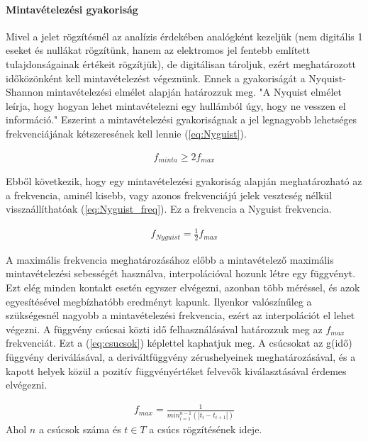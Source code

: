 \paragraph{Mintavételezési gyakoriság}
Mivel a jelet rögzítésnél az analízis érdekében analógként kezeljük (nem digitális 1 eseket és nullákat rögzítünk, hanem az elektromos jel fentebb említett tulajdonságainak értékeit rögzítjük), de digitálisan tároljuk, ezért meghatározott időközönként kell mintavételezést végeznünk. Ennek a gyakoriságát a Nyquist-Shannon mintavételezési elmélet alapján határozzuk meg. "A Nyquist elmélet leírja, hogy hogyan lehet mintavételezni egy hullámból úgy, hogy ne vesszen el információ."\cite{por2019nyquist} Eszerint a mintavételezési gyakoriságnak a jel legnagyobb lehetséges frekvenciájának kétszeresének kell lennie (\ref{eq:Nyguist})\cite{por2019nyquist}.

\begin{align}
    f_{minta} \geq 2f_{max}
    \label{eq:Nyguist}
\end{align}	
\cite{por2019nyquist}

Ebből következik, hogy egy mintavételezési gyakoriság alapján meghatározható az a frekvencia, aminél kisebb, vagy azonos frekvenciájú jelek veszteség nélkül visszaállíthatóak (\ref{eq:Nyguist_freq}). Ez a frekvencia a Nyguist frekvencia.

\begin{align}
    f_{Nyguist} = \frac{1}{2}f_{max}
    \label{eq:Nyguist_freq}
\end{align}	
\cite{por2019nyquist}

A maximális frekvencia meghatározásához előbb a mintavételező maximális mintavételezési sebességét használva, interpolációval hozunk létre egy függvényt. Ezt elég minden kontakt esetén egyszer elvégezni, azonban több méréssel, és azok egyesítésével megbízhatóbb eredményt kapunk. Ilyenkor valószínűleg a szükségesnél nagyobb a mintavételezési frekvencia, ezért az interpolációt el lehet végezni. A függvény csúcsai közti idő felhasználásával határozzuk meg az $f_{max}$ frekvenciát. Ezt a (\ref{eq:csucsok}) képlettel kaphatjuk meg. A csúcsokat az g(idő) függvény deriválásával, a deriváltfüggvény zérushelyeinek meghatározásával, és a kapott helyek közül a pozitív függvényértéket felvevők kiválasztásával érdemes elvégezni.

\begin{align}
    f_{max} = \frac{1}{min^{n - 1}_{i = 1}(|t_{i} - t_{i + 1}|)}
    \label{eq:csucsok}
\end{align}	
\small Ahol $n$ a csúcsok száma és $t \in T$ a csúcs rögzítésének ideje.

